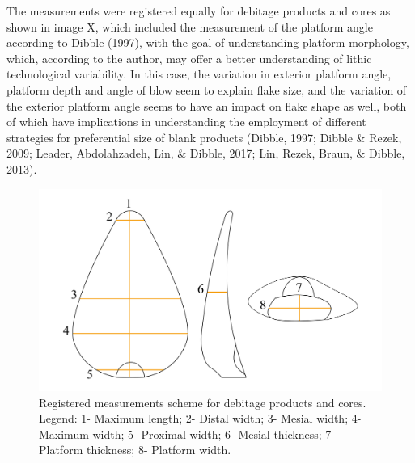 \documentclass[12pt,twoside]{reedthesis}
\begin{document}
The measurements were registered equally for debitage products and cores as shown in image X, which included the measurement of the platform angle according to Dibble (1997), with the goal of understanding platform morphology, which, according to the author, may offer a better understanding of lithic technological variability. In this case, the variation in exterior platform angle, platform depth and angle of blow seem to explain flake size, and the variation of the exterior platform angle seems to have an impact on flake shape as well, both of which have implications in understanding the employment of different strategies for preferential size of blank products (Dibble, 1997; Dibble \& Rezek, 2009; Leader, Abdolahzadeh, Lin, \& Dibble, 2017; Lin, Rezek, Braun, \& Dibble, 2013).
\begin{figure}
\includegraphics[width=1\linewidth]{figure/Metrics-01} \caption{Registered measurements scheme for debitage products and cores. Legend: 1- Maximum length; 2- Distal width; 3- Mesial width; 4- Maximum width; 5- Proximal width; 6- Mesial thickness; 7- Platform thickness; 8- Platform width.}\label{fig:unnamed-chunk-9}
\end{figure}
\end{document}
